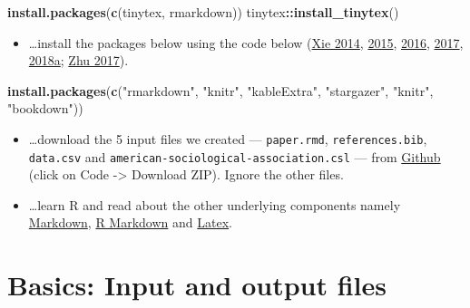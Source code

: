 \documentclass[
  12pt,
]{article}
\newenvironment{Shaded}{\begin{snugshade}}{\end{snugshade}}
\newcommand{\FunctionTok}[1]{\textcolor[rgb]{0.13,0.29,0.53}{\textbf{#1}}}
\newcommand{\NormalTok}[1]{#1}
\newcommand{\SpecialCharTok}[1]{\textcolor[rgb]{0.81,0.36,0.00}{\textbf{#1}}}
\newcommand{\StringTok}[1]{\textcolor[rgb]{0.31,0.60,0.02}{#1}}
\providecommand{\tightlist}{%
  \setlength{\itemsep}{0pt}\setlength{\parskip}{0pt}}
\begin{document}
\begin{Shaded}
\begin{Highlighting}[]
\FunctionTok{install.packages}\NormalTok{(}\FunctionTok{c}\NormalTok{(}\StringTok{\textquotesingle{}tinytex\textquotesingle{}}\NormalTok{, }\StringTok{\textquotesingle{}rmarkdown\textquotesingle{}}\NormalTok{))}
\NormalTok{tinytex}\SpecialCharTok{::}\FunctionTok{install\_tinytex}\NormalTok{()}
\end{Highlighting}
\end{Shaded}

\begin{itemize}
\tightlist
\item
  \ldots install the packages below using the code below (\protect\hyperlink{ref-knitr3}{Xie 2014}, \protect\hyperlink{ref-knitr2}{2015}, \protect\hyperlink{ref-bookdown2}{2016}, \protect\hyperlink{ref-bookdown1}{2017}, \protect\hyperlink{ref-knitr1}{2018a}; \protect\hyperlink{ref-kableextra}{Zhu 2017}).
\end{itemize}

\begin{Shaded}
\begin{Highlighting}[]
\FunctionTok{install.packages}\NormalTok{(}\FunctionTok{c}\NormalTok{(}\StringTok{"rmarkdown"}\NormalTok{, }\StringTok{"knitr"}\NormalTok{, }\StringTok{"kableExtra"}\NormalTok{,}
                   \StringTok{"stargazer"}\NormalTok{, }\StringTok{"knitr"}\NormalTok{,}
                   \StringTok{"bookdown"}\NormalTok{))}
\end{Highlighting}
\end{Shaded}

\begin{itemize}
\item
  \ldots download the 5 input files we created --- \texttt{paper.rmd}, \texttt{references.bib}, \texttt{data.csv} and \texttt{american-sociological-association.csl} --- from \href{https://github.com/paulcbauer/Writing_a_reproducable_paper_in_rmarkdown}{Github} (click on Code -\textgreater{} Download ZIP). Ignore the other files.
\item
  \ldots learn R and read about the other underlying components namely \href{https://en.wikipedia.org/wiki/Markdown}{Markdown}, \href{https://rmarkdown.rstudio.com/lesson-1.html}{R Markdown} and \href{https://en.wikipedia.org/wiki/LaTeX}{Latex}.
\end{itemize}

\hypertarget{basics-input-and-output-files}{%
\section{Basics: Input and output files}\label{basics-input-and-output-files}}
\end{document}
